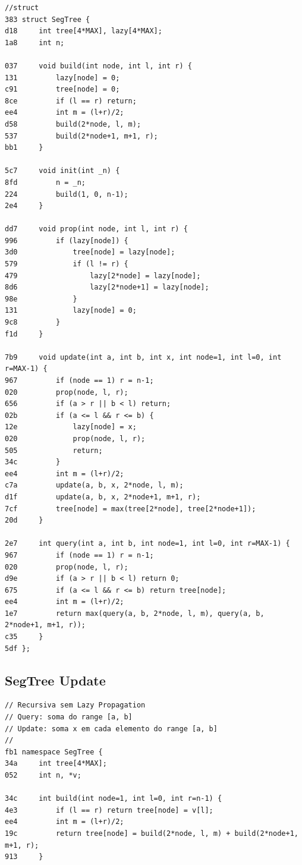 \documentclass[11pt, a4paper, twoside]{article}
\begin{document}
{\begin{lstlisting}
//struct
383 struct SegTree {
d18     int tree[4*MAX], lazy[4*MAX];
1a8     int n;
    
037     void build(int node, int l, int r) {
131         lazy[node] = 0;
c91         tree[node] = 0;
8ce         if (l == r) return;
ee4         int m = (l+r)/2;
d58         build(2*node, l, m);
537         build(2*node+1, m+1, r);
bb1     }
    
5c7     void init(int _n) {
8fd         n = _n;
224         build(1, 0, n-1);
2e4     }
    
dd7     void prop(int node, int l, int r) {
996         if (lazy[node]) {
3d0             tree[node] = lazy[node];
579             if (l != r) {
479                 lazy[2*node] = lazy[node];
8d6                 lazy[2*node+1] = lazy[node];
98e             }
131             lazy[node] = 0;
9c8         }
f1d     }
    
7b9     void update(int a, int b, int x, int node=1, int l=0, int r=MAX-1) {
967         if (node == 1) r = n-1;
020         prop(node, l, r);
656         if (a > r || b < l) return;
02b         if (a <= l && r <= b) {
12e             lazy[node] = x;
020             prop(node, l, r);
505             return;
34c         }
ee4         int m = (l+r)/2;
c7a         update(a, b, x, 2*node, l, m);
d1f         update(a, b, x, 2*node+1, m+1, r);
7cf         tree[node] = max(tree[2*node], tree[2*node+1]);
20d     }
    
2e7     int query(int a, int b, int node=1, int l=0, int r=MAX-1) {
967         if (node == 1) r = n-1;
020         prop(node, l, r);
d9e         if (a > r || b < l) return 0;
675         if (a <= l && r <= b) return tree[node];
ee4         int m = (l+r)/2;
1e7         return max(query(a, b, 2*node, l, m), query(a, b, 2*node+1, m+1, r));
c35     }
5df };
\end{lstlisting}

\subsection{SegTree Update}
\begin{lstlisting}
// Recursiva sem Lazy Propagation
// Query: soma do range [a, b]
// Update: soma x em cada elemento do range [a, b]
//
fb1 namespace SegTree {
34a     int tree[4*MAX];
052     int n, *v;
    
34c     int build(int node=1, int l=0, int r=n-1) {
4e3         if (l == r) return tree[node] = v[l];
ee4         int m = (l+r)/2;
19c         return tree[node] = build(2*node, l, m) + build(2*node+1, m+1, r);
913     }
    

\end{lstlisting}}
\end{document}
